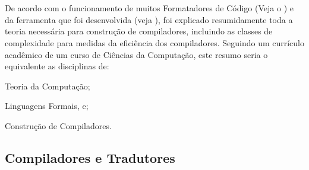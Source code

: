 

\chapter{}
\label{fundamentacaoTeorica}

De acordo com o funcionamento de muitos Formatadores de Código (Veja o ) e
da ferramenta que foi desenvolvida (veja ),
foi explicado resumidamente toda a teoria necessária para construção de compiladores,
incluindo as classes de complexidade para medidas da eficiência dos compiladores.
Seguindo um currículo acadêmico de um curso de Ciências da Computação,
este resumo seria o equivalente as disciplinas de:
\begin{inparaenum}[1)]
\item Teoria da Computação;
\item Linguagens Formais, e;
\item Construção de Compiladores.
\end{inparaenum}


\section{Compiladores e Tradutores}
\label{compiladoresEtradutores}

